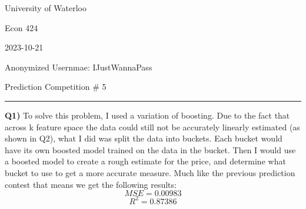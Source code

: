 \documentclass{article}
\begin{document}
\begin{titlepage}
	\setlength{\parindent}{0pt}
	\large

\vspace*{-2cm}

University of Waterloo \par
Econ 424 \par
2023-10-21 \par
\vspace{0.05cm}
Anonymized Usernmae: IJustWannaPass
\vspace{0.2cm}

{\huge Prediction Competition \# 5 \par}
\hrule

\vspace{1cm}
\textbf{Q1)} To solve this problem, I used a variation of boosting. Due to the fact that across k feature space the data could still not be accurately linearly estimated (as shown in Q2), what I did was split the data into buckets. Each bucket would have its own boosted model trained on the data in the bucket. Then I would use a boosted model to create a rough estimate for the price, and determine what bucket to use to get a more accurate measure. Much like the previous prediction contest that means we get the following results:
\[ MSE = 0.00983 \]
\[ R^2 = 0.87386 \]


\end{titlepage}
\end{document}

